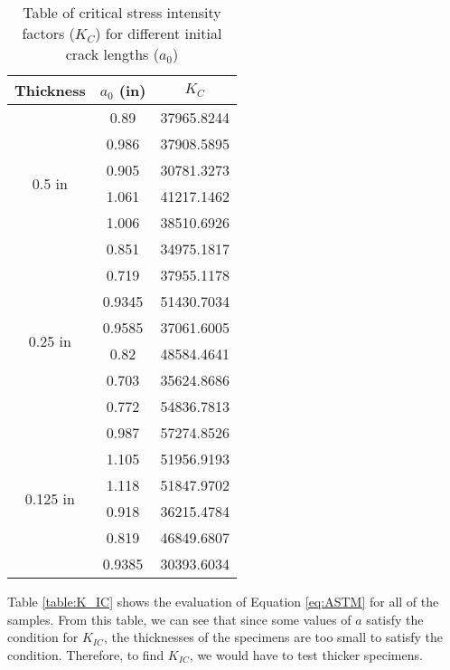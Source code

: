 \begin{table}[H]
\centering
\begin{tabular}{|c|c|c|}
\hline
\textbf{Thickness}        & \textbf{$a_0$ (in)} & \textbf{$K_C$} \\ \hline
\multirow{6}{*}{0.5 in}   & 0.89           & 37965.8244     \\ \cline{2-3} 
                          & 0.986          & 37908.5895     \\ \cline{2-3} 
                          & 0.905          & 30781.3273     \\ \cline{2-3} 
                          & 1.061          & 41217.1462     \\ \cline{2-3} 
                          & 1.006          & 38510.6926     \\ \cline{2-3} 
                          & 0.851          & 34975.1817     \\ \hline
\multirow{6}{*}{0.25 in}  & 0.719          & 37955.1178     \\ \cline{2-3} 
                          & 0.9345         & 51430.7034     \\ \cline{2-3} 
                          & 0.9585         & 37061.6005     \\ \cline{2-3} 
                          & 0.82           & 48584.4641     \\ \cline{2-3} 
                          & 0.703          & 35624.8686     \\ \cline{2-3} 
                          & 0.772          & 54836.7813     \\ \hline
\multirow{6}{*}{0.125 in} & 0.987          & 57274.8526     \\ \cline{2-3} 
                          & 1.105          & 51956.9193     \\ \cline{2-3} 
                          & 1.118          & 51847.9702     \\ \cline{2-3} 
                          & 0.918          & 36215.4784     \\ \cline{2-3} 
                          & 0.819          & 46849.6807     \\ \cline{2-3} 
                          & 0.9385         & 30393.6034     \\ \hline
\end{tabular}
\caption{Table of critical stress intensity factors ($K_C$) for different initial crack lengths ($a_0$)}
\label{table:Kcrit}
\end{table}

Table \ref{table:K_IC} shows the evaluation of Equation \ref{eq:ASTM} for all of the samples. From this table, we can see that since some values of $a$ satisfy the condition for $K_{IC}$, the thicknesses of the specimens are too small to satisfy the condition. Therefore, to find $K_{IC}$, we would have to test thicker specimens.

